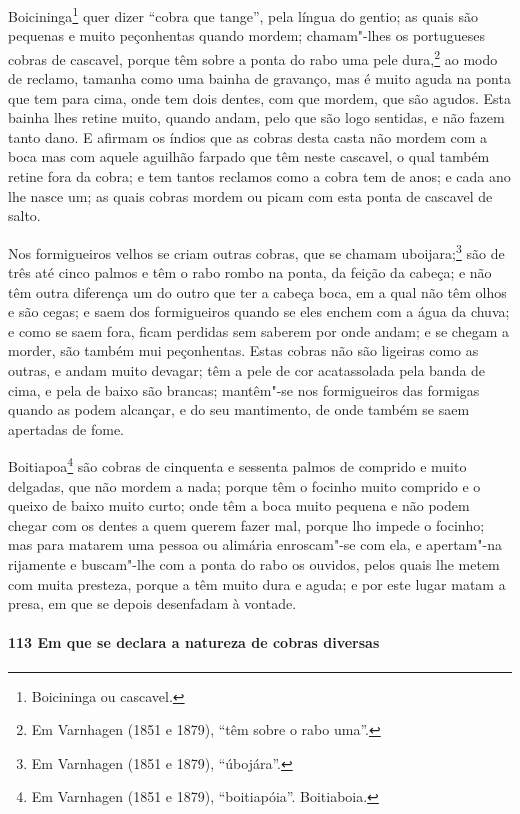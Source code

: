 Boicininga\footnote{ Boicininga ou cascavel.} quer dizer ``cobra que tange'', pela língua
do gentio; as quais são pequenas e muito peçonhentas quando mordem; chamam"-lhes os
portugueses cobras de cascavel, porque têm sobre a ponta do rabo uma pele dura,\footnote{
Em Varnhagen (1851 e 1879), ``têm sobre o rabo uma''.} ao modo de reclamo, tamanha como
uma bainha de gravanço, mas é muito aguda na ponta que tem para cima, onde tem dois
dentes, com que mordem, que são agudos. Esta bainha lhes retine muito, quando andam, pelo
que são logo sentidas, e não fazem tanto dano. E afirmam os índios que as cobras desta
casta não mordem com a boca mas com aquele aguilhão farpado que têm neste cascavel, o qual
também retine fora da cobra; e tem tantos reclamos como a cobra tem de anos; e cada ano
lhe nasce um; as quais cobras mordem ou picam com esta ponta de cascavel de salto.

Nos formigueiros velhos se criam outras cobras, que se chamam uboijara;\footnote{ Em
Varnhagen (1851 e 1879), ``úbojára''.} são de três até cinco palmos e têm o rabo rombo na
ponta, da feição da cabeça; e não têm outra diferença um do outro que ter a cabeça boca,
em a qual não têm olhos e são cegas; e saem dos formigueiros quando se eles enchem com a
água da chuva; e como se saem fora, ficam perdidas sem saberem por onde andam; e se chegam
a morder, são também mui peçonhentas. Estas cobras não são ligeiras como as outras, e
andam muito devagar; têm a pele de cor acatassolada pela banda de cima, e pela de baixo
são brancas; mantêm"-se nos formigueiros das formigas quando as podem alcançar, e do seu
mantimento, de onde também se saem apertadas de fome.

Boitiapoa\footnote{ Em Varnhagen (1851 e 1879), ``boitiapóia''. Boitiaboia.} são cobras de
cinquenta e sessenta palmos de comprido e muito delgadas, que não mordem a nada; porque
têm o focinho muito comprido e o queixo de baixo muito curto; onde têm a boca muito
pequena e não podem chegar com os dentes a quem querem fazer mal, porque lho impede o
focinho; mas para matarem uma pessoa ou alimária enroscam"-se com ela, e apertam"-na
rijamente e buscam"-lhe com a ponta do rabo os ouvidos, pelos quais lhe metem com muita
presteza, porque a têm muito dura e aguda; e por este lugar matam a presa, em que se
depois desenfadam à vontade.

\paragraph{113 Em que se declara a natureza de cobras diversas}

